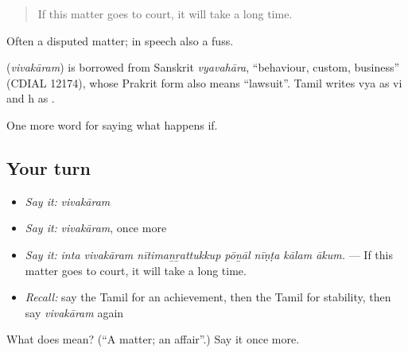 \begin{quote}
If this matter goes to court, it will take a long time.
\end{quote}

Often a disputed matter; in speech also a fuss.

\begin{cousinweb}
\textbf{} (\emph{vivakāram}) is borrowed from Sanskrit \emph{vyavahāra}, \textquotedblleft{}behaviour, custom, business\textquotedblright{} (CDIAL 12174), whose Prakrit form also means \textquotedblleft{}lawsuit\textquotedblright{}. Tamil writes vya as vi and h as .
\end{cousinweb}

\begin{grammarlens}[title={What you've built}]
One more word for saying what happens if.
\end{grammarlens}

\subsection*{Your turn}
\begin{itemize}
\raggedright
  \item \emph{Say it:} \emph{vivakāram}
  \item \emph{Say it:} \emph{vivakāram}, once more
  \item \emph{Say it:} \emph{inta vivakāram nītimaṉṟattukkup pōṉāl nīṇṭa kālam ākum.} — If this matter goes to court, it will take a long time.
  \item \emph{Recall:} say the Tamil for an achievement, then the Tamil for stability, then say \emph{vivakāram} again
\end{itemize}

\begin{tcolorbox}[breakable,colback=teal!4,colframe=teal!35!black,title={Before you move on}]
What does  mean? (\textquotedblleft{}A matter; an affair\textquotedblright{}.) Say it once more.
\end{tcolorbox}
